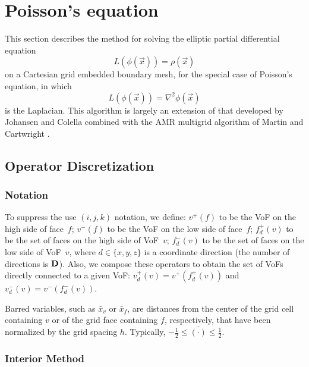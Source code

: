 \newcommand{\sfrac}[2]{\mbox{$\frac{#1}{#2}$}}
\def\udelu{\ubold \cdot \nabla \ubold}


\section{Poisson's equation}
This section describes the method for solving the elliptic partial
differential equation
\begin{equation}
L(\phi(\vec{x})) = \rho(\vec{x})
\end{equation}
on a Cartesian grid embedded boundary mesh, for the special case of
Poisson's equation, in which
\begin{equation}
L(\phi(\vec{x})) = \nabla^2 \phi(\vec{x})
\end{equation}
is the Laplacian.  This algorithm is largely an extension of that
developed by Johansen and Colella \cite{JohansenColella1998} combined with
the AMR multigrid algorithm of Martin and  Cartwright \cite{MARTCART}.


\subsection{Operator Discretization}
\label{sec::discrete}

\subsubsection{Notation}
 
To suppress the use $(i,j,k)$ notation, we define:  $v^+(f)$ to be the
VoF on the high side of face~$f$; $v^-(f)$ to be the VoF on the low side
of face~$f$; $f^+_d(v)$ to be the set of faces on the high side of
VoF~$v$; $f^-_d(v)$ to be the set of faces on the low side of VoF~$v$,
where $d\in\{x,y,z\}$ is a coordinate direction (the number of
directions is ${\mathbf{D}}$).  Also, we compose these operators to obtain the
set of VoFs directly connected to a given VoF:  $v^+_d(v) =
v^+(f^+_d(v))$ and $v^-_d(v) = v^-(f^-_d(v))$.

Barred variables, such as $\bar{x}_v$ or $\bar{x}_f$, are distances from the
center of the grid cell containing $v$ or of the grid face containing $f$,
respectively, that have been normalized by the grid spacing $h$.  Typically,
$-\sfrac{1}{2} \le \bar{(\cdot)} \le \sfrac{1}{2}$.


\subsubsection{Interior Method}

